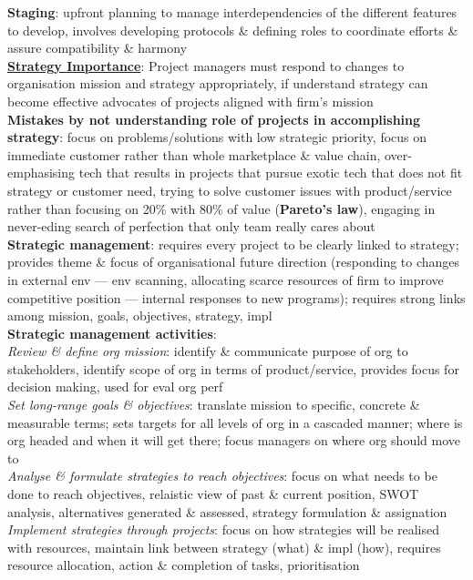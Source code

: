 \documentclass[a4paper]{article}
\begin{document}
\begin{multicols}{3}
        \textbf{Staging}: upfront planning to manage interdependencies of the different features to develop, involves developing protocols \& defining roles to coordinate efforts \& assure compatibility \& harmony\\
        \underline{\textbf{Strategy Importance}}: Project managers must respond to changes to organisation mission and strategy appropriately, if understand strategy can become effective advocates of projects aligned with firm's mission\\
        \textbf{Mistakes by not understanding role of projects in accomplishing strategy}: focus on problems/solutions with low strategic priority, focus on immediate customer rather than whole marketplace \& value chain, over-emphasising tech that results in projects that pursue exotic tech that does not fit strategy or customer need, trying to solve customer issues with product/service rather than focusing on 20\% with 80\% of value (\textbf{Pareto's law}), engaging in never-eding search of perfection that only team really cares about\\
        \textbf{Strategic management}: requires every project to be clearly linked to strategy; provides theme \& focus of organisational future direction (responding to changes in external env --- env scanning, allocating scarce resources of firm to improve competitive position --- internal responses to new programs); requires strong links among mission, goals, objectives, strategy, impl\\
        \textbf{Strategic management activities}:\\
        \textit{Review \& define org mission}: identify \& communicate purpose of org to stakeholders, identify scope of org in terms of product/service, provides focus for decision making, used for eval org perf\\
        \textit{Set long-range goals \& objectives}: translate mission to specific, concrete \& measurable terms; sets targets for all levels of org in a cascaded manner; where is org headed and when it will get there; focus managers on where org should move to\\
        \textit{Analyse \& formulate strategies to reach objectives}: focus on what needs to be done to reach objectives, relaistic view of past \& current position, SWOT analysis, alternatives generated \& assessed, strategy formulation \& assignation\\
        \textit{Implement strategies through projects}: focus on how strategies will be realised with resources, maintain link between strategy (what) \& impl (how), requires resource allocation, action \& completion of tasks, prioritisation\\

\end{multicols}
\end{document}
